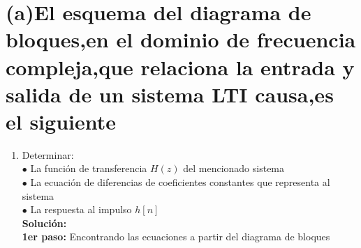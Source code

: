 \documentclass[11pt,a4paper]{article}
\begin{document}
	\section{{\large \textbf{(a)El esquema del diagrama de bloques,en el dominio de frecuencia compleja,que relaciona la entrada y salida de un sistema LTI causa,es el siguiente }}}{
	\large{
	\begin{enumerate}
	\item[\textbf{}]
	
	Determinar:\\
	$\bullet$ La función de transferencia $H(z)$ del mencionado sistema\\
	$\bullet$ La ecuación de diferencias de coeficientes constantes que representa al sistema\\
	$\bullet$ La respuesta al impulso $h[n]$\\
	\textbf{Solución:}\\
	\textbf{1er paso:}
	Encontrando las ecuaciones a partir del diagrama de bloques
	

\end{enumerate}}}
\end{document}
